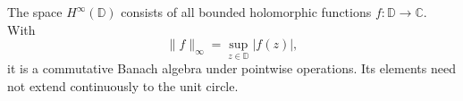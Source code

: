 
The space $H^\infty(\mathbb D)$ consists of all bounded holomorphic functions $f:\mathbb D\to\mathbb C$. With
\[
\|f\|_\infty=\sup_{z\in\mathbb D}|f(z)|,
\]
it is a commutative Banach algebra under pointwise operations. Its elements need not extend continuously to the unit circle.
